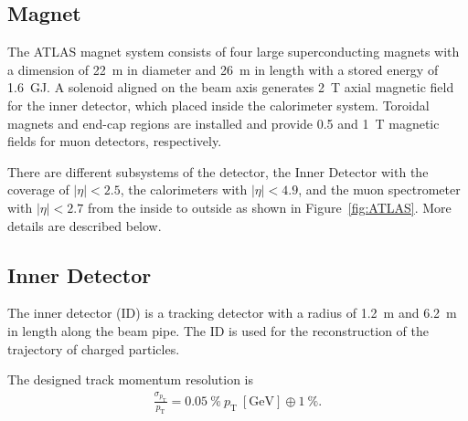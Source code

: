 \subsection{Magnet}
The ATLAS magnet system consists of four large superconducting magnets with a dimension of 22~m in diameter and 26~m in length with a stored energy of 1.6~GJ. A solenoid aligned on the beam axis generates 2~T axial magnetic field for the inner detector, which placed inside the calorimeter system. 
Toroidal magnets and end-cap regions are installed and provide 0.5 and 1~T magnetic fields for muon detectors, respectively.

There are different subsystems of the detector, the Inner Detector with the coverage of $| \eta | < 2.5$, the calorimeters with $| \eta | < 4.9$, and  the muon spectrometer with $| \eta | < 2.7$ from the inside to outside as shown in Figure~\ref{fig:ATLAS}. 
More details are described below.

\subsection{Inner Detector}
The inner detector (ID) is a tracking detector with a radius of 1.2~m and 6.2~m in length along the beam pipe. 
The ID is used for the reconstruction of the trajectory of charged particles. 

The designed track momentum resolution is
\begin{eqnarray*}
    \frac{\sigma_{p_{\mathrm{T}}}}{p_{\mathrm{T}}} = 0.05~\% ~p_{\mathrm{T}}~[\mathrm{GeV}] \oplus 1~\%.
\end{eqnarray*}

